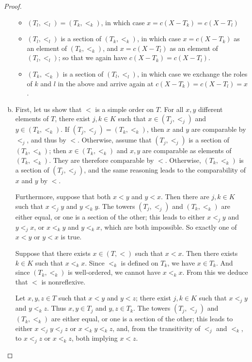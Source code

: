 \documentclass[11pt,a4paper,twoside]{article}
\theoremstyle{definition}
\theoremstyle{plain}
\begin{document}
\begin{proof}
\begin{enumerate}[(a)]
\begin{itemize}
    \item $( T_l, <_l ) = (T_k, <_k)$, in which case $x = c ( X - T_k ) = c ( X - T_l )$

    \item $( T_l, <_l )$ is a section of $( T_k, <_k )$, in which case $x = c ( X - T_k )$ as an element of $( T_k, <_k )$,
      and $x = c ( X - T_l )$ as an element of $( T_l, <_l )$; so that we again have $c ( X - T_k ) = c ( X - T_l )$.

    \item $( T_k, <_k )$ is a section of $( T_l, <_l )$, in which case we exchange the roles of $k$ and $l$ in the above
      and arrive again at $c ( X - T_k ) = c ( X - T_l ) = x$.

    \end{itemize}

  \item First, let us show that $<$ is a simple order on $T$. For all $x, y$ different
    elements of $T$, there exist $j, k \in K$ such that $x \in ( T_j, <_j )$ and $y \in ( T_k, <_k )$.
    If $( T_j, <_j ) = ( T_k, <_k )$, then $x$ and $y$ are comparable by $<_j$, and thus
    by $<$. Otherwise, assume that $( T_j, <_j )$ is a section of $( T_k, <_k )$; then
    $x \in ( T_k, <_k )$ and $x, y$ are comparable as elements of $( T_k, <_k )$. They
    are therefore comparable by $<$. Otherwise, $( T_k, <_k )$ is a section of $( T_j, <_j )$,
    and the same reasoning leads to the comparability of $x$ and $y$ by $<$.

    Furthermore, suppose that both $x < y$ and $y < x$. Then there are $j, k \in K$ such
    that $x <_j y$ and $y <_k y$. The towers $( T_j, <_j )$ and $( T_k, <_k )$ are either
    equal, or one is a section of the other; this leads to either $x <_j y$ and $y <_j x$,
    or $x <_k y$ and $y <_k x$, which are both impossible. So exactly one of $x < y$ or
    $y < x$ is true.

    Suppose that there exists $x \in ( T, < )$ such that $x < x$. Then there exists $k \in K$
    such that $x <_k x$. Since $<_k$ is defined on $T_k$, we have $x \in T_k$. And since
    $( T_k, <_k )$ is well-ordered, we cannot have $x <_k x$. From this we deduce that
    $<$ is nonreflexive.

    Let $x, y, z \in T$ such that $x <y$ and $y < z$; there exist $j, k \in K$ such that
    $x <_j y$ and $y <_k z$. Thus $x, y \in T_j$ and $y, z \in T_k$. The towers $( T_j, <_j )$
    and $( T_k, <_k )$ are either equal, or one is a section of the other; this leads to either
    $x <_j y <_j z$ or $x <_k y <_k z$, and, from the transitivity of $<_j$ and $<_k$, to
    $x <_j z$ or $x <_k z$, both implying $x < z$.


\end{enumerate}
\end{proof}
\end{document}
